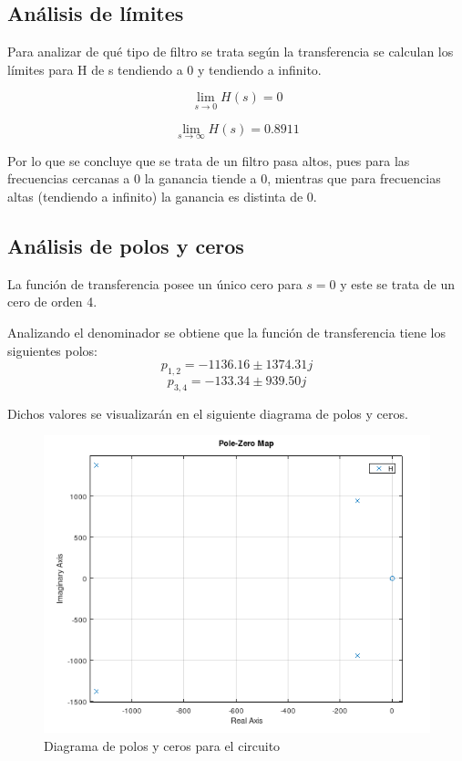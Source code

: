 \subsection{Análisis de límites}
Para analizar de qué tipo de filtro se trata según la transferencia se calculan los límites para H de s tendiendo a 0 y tendiendo a infinito.

\begin{minipage}{\linewidth}
  \centering
  \begin{minipage}{0.45\linewidth}
    $$\lim_{s \rightarrow 0} H(s) = 0$$
  \end{minipage}
  \hspace{0.05\linewidth}
  \begin{minipage}{0.45\linewidth}
    $$\lim_{s \rightarrow \infty} H(s) = 0.8911$$
  \end{minipage}
\end{minipage}
\vskip0.5cm

Por lo que se concluye que se trata de un filtro pasa altos, pues para las frecuencias cercanas a 0 la ganancia tiende a 0, mientras que para frecuencias altas (tendiendo a infinito) la ganancia es distinta de 0. 

\subsection{Análisis de polos y ceros}
La función de transferencia posee un único cero para $s=0$ y este se trata de un cero de orden 4.

Analizando el denominador se obtiene que la función de transferencia tiene los siguientes polos:
$$
p_{1, 2} = -1136.16 \pm 1374.31 j
$$
$$
p_{3, 4} = -133.34 \pm 939.50 j
$$

Dichos valores se visualizarán en el siguiente diagrama de polos y ceros.

\begin{figure}[H]
    \centering
    \includegraphics[width=1\textwidth]{resources/pzmap.png}
    \caption{Diagrama de polos y ceros para el circuito}
\end{figure}

